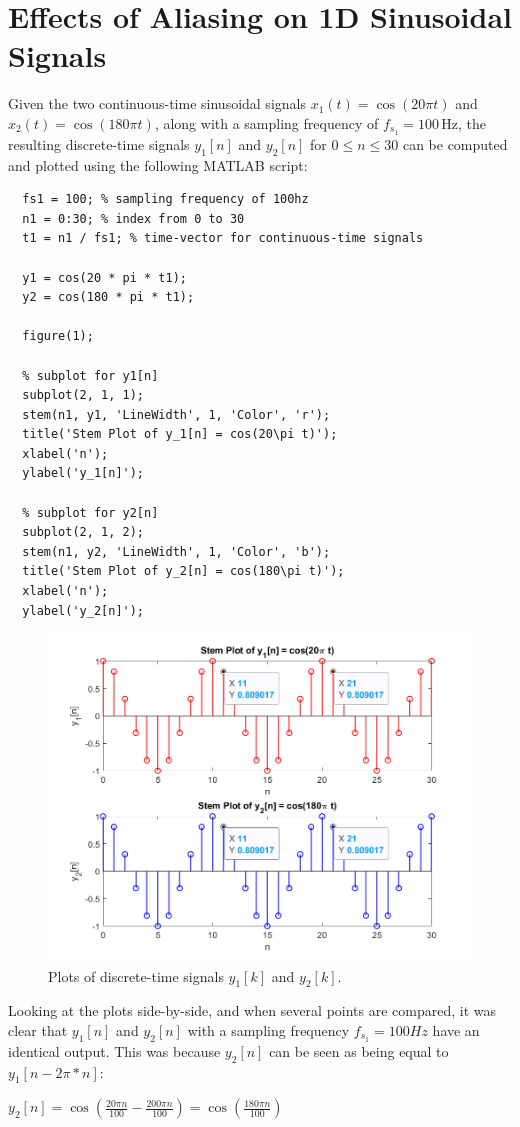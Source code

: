 \documentclass[a4paper, 10pt]{article}
\begin{document}
\section{Effects of Aliasing on 1D Sinusoidal Signals}
Given the two continuous-time sinusoidal signals $x_1(t) = \cos(20\pi t)$ and $x_2(t) = \cos(180\pi t)$, along with
a sampling frequency of $f_{s_1} = 100 \, \text{Hz}$, the resulting discrete-time signals $y_1[n]$ and $y_2[n]$ for 
$0 \leq n \leq 30$ can be computed and plotted using the following MATLAB script:
\begin{lstlisting}[style=Matlab-editor, basicstyle=\small\ttfamily]
  % get y1 and y2
  fs1 = 100; % sampling frequency of 100hz
  n1 = 0:30; % index from 0 to 30
  t1 = n1 / fs1; % time-vector for continuous-time signals
  
  y1 = cos(20 * pi * t1);
  y2 = cos(180 * pi * t1);
  
  figure(1);
  
  % subplot for y1[n]
  subplot(2, 1, 1);
  stem(n1, y1, 'LineWidth', 1, 'Color', 'r');
  title('Stem Plot of y_1[n] = cos(20\pi t)');
  xlabel('n');
  ylabel('y_1[n]');
  
  % subplot for y2[n]
  subplot(2, 1, 2);
  stem(n1, y2, 'LineWidth', 1, 'Color', 'b');
  title('Stem Plot of y_2[n] = cos(180\pi t)');
  xlabel('n');
  ylabel('y_2[n]');  
\end{lstlisting}
\begin{figure}[H]
  \centering
  \includegraphics[width=12cm]{images/q3_a.png}
  \caption{Plots of discrete-time signals $y_1[k]$ and $y_2[k]$.}
\end{figure}
Looking at the plots side-by-side, and when several points are compared, it was clear that $y_1[n]$ and $y_2[n]$ with
a sampling frequency $f_{s_1} = 100Hz$ have an identical output. This was because $y_2[n]$ can be seen as being equal to
$y_1[n-2\pi * n]$:
\begin{center}
  $y_2[n] = \cos(\frac{20\pi n}{100} - \frac{200\pi n}{100}) = \cos(\frac{180\pi n}{100})$
\end{center}
\end{document}
